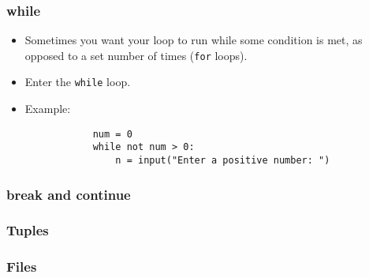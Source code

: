 \documentclass[notes]{beamer}
\begin{document}
	\begin{frame}[fragile]
		\frametitle{while}
		\begin{itemize}
			\item Sometimes you want your loop to run while some condition is met, as opposed to a set number of times (\lstinline|for| loops).
			\item Enter the \lstinline|while| loop.
			\pause
			\item Example:
			\begin{lstlisting}
			num = 0
			while not num > 0:
			    n = input("Enter a positive number: ")
			\end{lstlisting}

		\end{itemize}
	\end{frame}
	
	\begin{frame}[fragile]
		\frametitle{break and continue}
	\end{frame}
	
	\begin{frame}[fragile]
		\frametitle{Tuples}
	\end{frame}
	
	\begin{frame}[fragile]
		\frametitle{Files}
	\end{frame}
\end{document}
